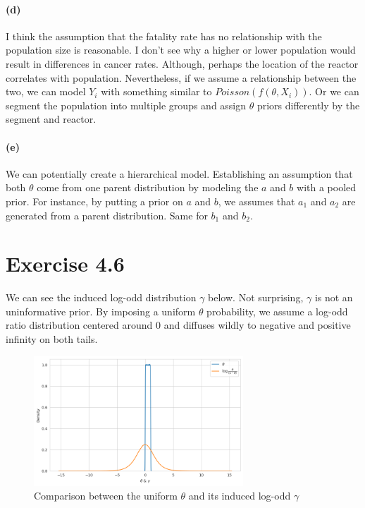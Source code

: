 \documentclass[11pt, letterpaper]{article}
\begin{document}
\paragraph{(d)}
I think the assumption that the fatality rate has no relationship with the population size is reasonable. I don't see why a higher or lower population would result in differences in cancer rates. Although, perhaps the location of the reactor correlates with population. Nevertheless, if we assume a relationship between the two, we can model $Y_i$ with something similar to $Poisson(f(\theta, X_i))$. Or we can segment the population into multiple groups and assign $\theta$ priors differently by the segment and reactor.

\paragraph{(e)}
We can potentially create a hierarchical model. Establishing an assumption that both $\theta$ come from one parent distribution by modeling the $a$ and $b$ with a pooled prior. For instance, by putting a prior on $a$ and $b$, we assumes that $a_1$ and $a_2$ are generated from a parent distribution. Same for $b_1$ and $b_2$.


\section{Exercise 4.6}
We can see the induced log-odd distribution $\gamma$ below. Not surprising, $\gamma$ is not an uninformative prior. By imposing a uniform $\theta$ probability, we assume a log-odd ratio distribution centered around 0 and diffuses wildly to negative and positive infinity on both tails.

\begin{figure}[!h]
  \centering
  \includegraphics[width=0.7\textwidth]{4.6.png}
  \captionsetup{justification=centering}
  \caption{Comparison between the uniform $\theta$ and its induced log-odd $\gamma$}
\end{figure}
\end{document}
